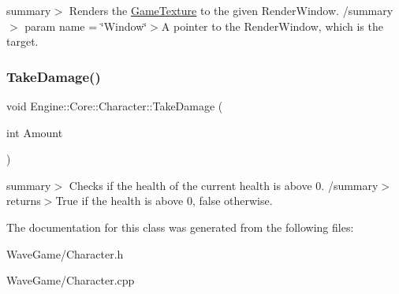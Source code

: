 summary$>$ Renders the \hyperlink{class_engine_1_1_core_1_1_game_texture}{Game\+Texture} to the given Render\+Window. /summary$>$ param name = \char`\"{}\+Window\char`\"{}$>$A pointer to the Render\+Window, which is the target.\mbox{\label{class_engine_1_1_core_1_1_character_a2156c371584ca6a8d2961154f1b49c09}} 
\subsubsection{\texorpdfstring{Take\+Damage()}{TakeDamage()}}
{\footnotesize\ttfamily void Engine\+::\+Core\+::\+Character\+::\+Take\+Damage (\begin{DoxyParamCaption}\item[{int}]{Amount }\end{DoxyParamCaption})}

summary$>$ Checks if the health of the current health is above 0. /summary$>$ returns$>$True if the health is above 0, false otherwise.

The documentation for this class was generated from the following files\+:\begin{DoxyCompactItemize}
\item 
Wave\+Game/Character.\+h\item 
Wave\+Game/Character.\+cpp\end{DoxyCompactItemize}
